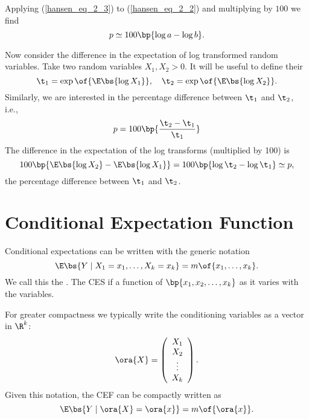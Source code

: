 Applying (\ref{hansen_eq_2_3}) to (\ref{hansen_eq_2_2}) and multiplying by $100$ we find 
\begin{equation}
    \notag 
    p \simeq 100 \bp{\log a - \log b}.
\end{equation}

Now consider the difference in the expectation of log transformed random variables. Take two random variables $X_1, X_2 > 0$. It will be useful to define their  $$\t_1 = \exp\of{\E\bs{\log X_1}}, \quad \t_2 = \exp\of{\E\bs{\log X_2}}.$$
Similarly, we are interested in the percentage difference between $\t_1$ and $\t_2$, i.e., 
\begin{equation}
    \notag 
    p = 100 \bp{\frac{\t_2 - \t_1}{\t_1}}
\end{equation}
The difference in the expectation of the log transforms (multiplied by 100) is 
$$100\bp{\E\bs{\log X_2} - \E\bs{\log X_1}} = 100 \bp{\log\t_2 - \log\t_1} \simeq p,$$
the percentage difference between $\t_1$ and $\t_2$. 

\section{Conditional Expectation Function}

Conditional expectations can be written with the generic notation $$\E\bs{Y \mid X_1=x_1, \ldots, X_k=x_k} = m\of{x_1, \ldots, x_k}.$$
We call this the . The CES if a function of $\bp{x_1, x_2, \ldots, x_k}$ as it varies with the variables. 

For greater compactness we typically write the conditioning variables as a vector in $\R^k$:
\begin{equation}
    \label{hansen_eq_2_4}
    \ora{X} = \left(\begin{array}{c}
        X_1 \\
        X_2 \\
        \vdots \\
        X_k
    \end{array}\right).
\end{equation}
Given this notation, the CEF can be compactly written as 
\begin{equation}
    \notag 
    \E\bs{Y \mid \ora{X} = \ora{x}} = m\of{\ora{x}}.
\end{equation}

